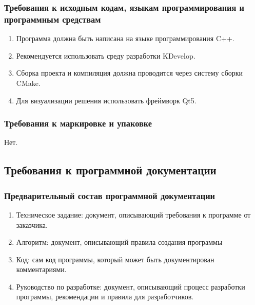  \subsubsection{ Требования к исходным кодам, языкам программирования и программным средствам}
 \begin{enumerate}
  \item Программа должна быть написана на языке программирования C++.
  \item Рекомендуется использовать среду разработки KDevelop.
  \item Сборка проекта и компиляция должна проводится через систему сборки CMake.
  \item Для визуализации решения использовать фреймворк Qt5.
 \end{enumerate}

 \subsubsection{Требования к маркировке и упаковке}
 Нет.

 \subsection{Требования к программной документации}

 \subsubsection{Предварительный состав программной документации}
 \begin{enumerate}
  \item Техническое задание: документ, описывающий требования к программе от заказчика.
  \item Алгоритм: документ, описывающий правила создания программы
  \item Код: сам код программы, который может быть документирован комментариями.
  \item Руководство по разработке: документ, описывающий процесс разработки программы, рекомендации и правила для разработчиков.
 \end{enumerate}

